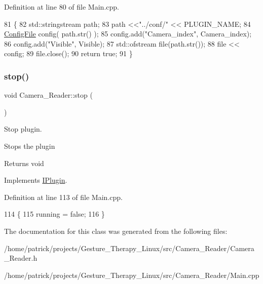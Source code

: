 Definition at line 80 of file Main.\+cpp.


\begin{DoxyCode}
81 \{
82     std::stringstream path;
83     path <<\textcolor{stringliteral}{"../conf/"} << PLUGIN\_NAME;
84     \hyperlink{class_config_file}{ConfigFile} config( path.str() );
85     config.add(\textcolor{stringliteral}{"Camera\_index"}, Camera\_index);
86     config.add(\textcolor{stringliteral}{"Visible"}, Visible);
87     std::ofstream file(path.str());
88     file << config;
89     file.close();
90     \textcolor{keywordflow}{return} \textcolor{keyword}{true};
91 \}
\end{DoxyCode}
\mbox{\label{class_camera___reader_afac6f0a4e2c0df76cad8f1d0d20cdc59}} 
\subsubsection{\texorpdfstring{stop()}{stop()}}
{\footnotesize\ttfamily void Camera\+\_\+\+Reader\+::stop (\begin{DoxyParamCaption}{ }\end{DoxyParamCaption})\hspace{0.3cm}{\ttfamily [virtual]}}



Stop plugin. 

Stops the plugin \begin{DoxyReturn}{Returns}
void 
\end{DoxyReturn}


Implements \hyperlink{class_i_plugin_a86e523c283aec5c9fb21249a76e916ac}{I\+Plugin}.



Definition at line 113 of file Main.\+cpp.


\begin{DoxyCode}
114 \{
115     running = \textcolor{keyword}{false};
116 \}
\end{DoxyCode}


The documentation for this class was generated from the following files\+:\begin{DoxyCompactItemize}
\item 
/home/patrick/projects/\+Gesture\+\_\+\+Therapy\+\_\+\+Linux/src/\+Camera\+\_\+\+Reader/Camera\+\_\+\+Reader.\+h\item 
/home/patrick/projects/\+Gesture\+\_\+\+Therapy\+\_\+\+Linux/src/\+Camera\+\_\+\+Reader/Main.\+cpp\end{DoxyCompactItemize}
